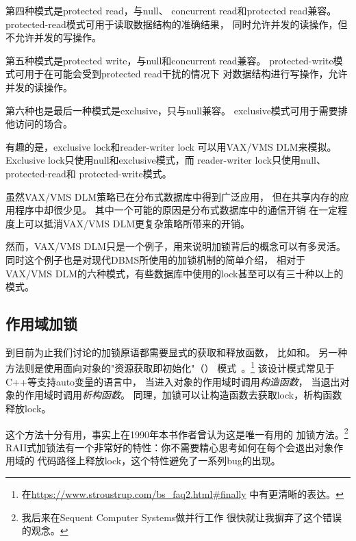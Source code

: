 第四种模式是protected read，与null、
concurrent read和protected read兼容。
protected-read模式可用于读取数据结构的准确结果，
同时允许并发的读操作，但不允许并发的写操作。

第五种模式是protected write，与null和concurrent read兼容。
protected-write模式可用于在可能会受到protected read干扰的情况下
对数据结构进行写操作，允许并发的读操作。

第六种也是最后一种模式是exclusive，只与null兼容。
exclusive模式可用于需要排他访问的场合。

有趣的是，exclusive lock和reader-writer lock
可以用VAX/VMS DLM来模拟。
Exclusive lock只使用null和exclusive模式，而
reader-writer lock只使用null、protected-read和
protected-write模式。

\QuickQuizEnd

虽然VAX/VMS DLM策略已在分布式数据库中得到广泛应用，
但在共享内存的应用程序中却很少见。
其中一个可能的原因是分布式数据库中的通信开销
在一定程度上可以抵消VAX/VMS DLM更复杂策略所带来的开销。

然而，VAX/VMS DLM只是一个例子，用来说明加锁背后的概念可以有多灵活。
同时这个例子也是对现代DBMS所使用的加锁机制的简单介绍，
相对于VAX/VMS DLM的六种模式，有些数据库中使用的lock甚至可以有三十种以上的模式。

\subsection{作用域加锁}
\label{sec:locking:Scoped Locking}

到目前为止我们讨论的加锁原语都需要显式的获取和释放函数，
比如和。
另一种方法则是使用面向对象的"资源获取即初始化"（）
模式~\cite{MargaretAEllis1990Cplusplus}。\footnote{
	在\url{https://www.stroustrup.com/bs_faq2.html\#finally}
	中有更清晰的表达。}
该设计模式常见于C++等支持auto变量的语言中，
当进入对象的作用域时调用\emph{构造函数}，
当退出对象的作用域时调用\emph{析构函数}。
同理，加锁可以让构造函数去获取lock，析构函数释放lock。

这个方法十分有用，事实上在1990年本书作者曾认为这是唯一有用的
加锁方法。\footnote{
	我后来在Sequent Computer Systems做并行工作
	很快就让我摒弃了这个错误的观念。}
RAII式加锁法有一个非常好的特性：你不需要精心思考如何在每个会退出对象作用域的
代码路径上释放lock，这个特性避免了一系列bug的出现。

